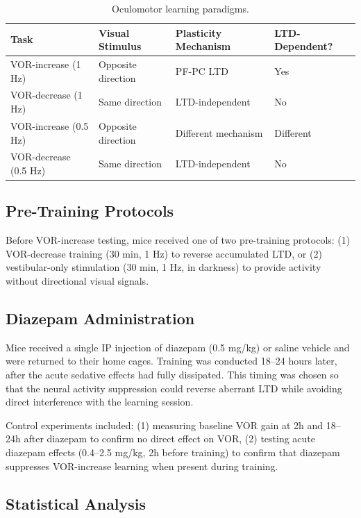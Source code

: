 \documentclass[11pt]{article}
\begin{document}
\begin{table}[h]
\centering
\caption{Oculomotor learning paradigms.}
\label{tab:paradigms}
\begin{tabular}{llll}
\toprule
Task & Visual Stimulus & Plasticity Mechanism & LTD-Dependent? \\
\midrule
VOR-increase (1 Hz) & Opposite direction & PF-PC LTD & Yes \\
VOR-decrease (1 Hz) & Same direction & LTD-independent & No \\
VOR-increase (0.5 Hz) & Opposite direction & Different mechanism & Different \\
VOR-decrease (0.5 Hz) & Same direction & LTD-independent & No \\
\bottomrule
\end{tabular}
\end{table}

\subsection{Pre-Training Protocols}

Before VOR-increase testing, mice received one of two pre-training protocols: (1) VOR-decrease training (30 min, 1 Hz) to reverse accumulated LTD, or (2) vestibular-only stimulation (30 min, 1 Hz, in darkness) to provide activity without directional visual signals.

\subsection{Diazepam Administration}

Mice received a single IP injection of diazepam (0.5 mg/kg) or saline vehicle and were returned to their home cages. Training was conducted 18--24 hours later, after the acute sedative effects had fully dissipated. This timing was chosen so that the neural activity suppression could reverse aberrant LTD while avoiding direct interference with the learning session.

Control experiments included: (1) measuring baseline VOR gain at 2h and 18--24h after diazepam to confirm no direct effect on VOR, (2) testing acute diazepam effects (0.4--2.5 mg/kg, 2h before training) to confirm that diazepam suppresses VOR-increase learning when present during training.

\subsection{Statistical Analysis}
\end{document}
